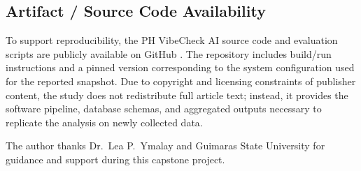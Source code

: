 \documentclass[sigconf, nonacm]{acmart}
\begin{document}
\subsection{Artifact / Source Code Availability}
To support reproducibility, the PH VibeCheck AI source code and evaluation scripts are publicly available on GitHub \cite{pheye_github}. The repository includes build/run instructions and a pinned version corresponding to the system configuration used for the reported snapshot. Due to copyright and licensing constraints of publisher content, the study does not redistribute full article text; instead, it provides the software pipeline, database schemas, and aggregated outputs necessary to replicate the analysis on newly collected data.

\begin{acks}
The author thanks Dr.\ Lea P.\ Ymalay and Guimaras State University for guidance and support during this capstone project.
\end{acks}



\end{document}

